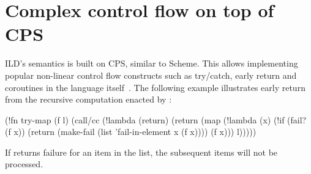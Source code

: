 \section{Complex control flow on top of CPS}

ILD's semantics is built on CPS, similar to Scheme. This allows implementing
popular non-linear control flow constructs such as try/catch, early return
and coroutines in the language itself~\cite{r5rs}.
The following example illustrates early return from the recursive computation
enacted by :
\begin{ildcode}
(!fn try-map (f l)
  (call/cc (!lambda (return)
    (return (map
      (!lambda (x)
        (!if (fail? (f x))
          (return
            (make-fail
            (list 'fail-in-element x (f x))))
          (f x))) l)))))
\end{ildcode}
If  returns failure for an item in the list, the subsequent items will not
be processed.
